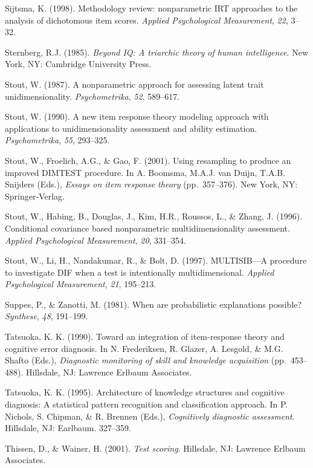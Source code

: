 \documentclass[titlepage,11pt,twoside]{article}
\begin{document}
\begin{thebibliography}
\bibitem Sijtsma, K. (1998). Methodology review: nonparametric IRT approaches to the analysis of dichotomous item scores. \textit{Applied Psychological Measurement}, \textit{22}, 3--32.

\bibitem Sternberg, R.J. (1985). \textit{Beyond IQ: A triarchic theory of human intelligence}. New York, NY: Cambridge University Press.

\bibitem Stout, W. (1987). A nonparametric approach for assessing latent trait unidimensionality. \textit{Psychometrika}, \textit{52}, 589--617.

\bibitem Stout, W. (1990). A new item response theory modeling approach with applications to unidimensionality assessment and ability estimation. \textit{Psychometrika}, \textit{55}, 293--325.

\bibitem Stout, W., Froelich, A.G., \& Gao, F. (2001). Using resampling to produce an improved DIMTEST procedure. In A. Boomsma, M.A.J. van Duijn, T.A.B. Snijders (Eds.), \textit{Essays on item response theory} (pp.~357--376). New York, NY: Springer-Verlag.

\bibitem Stout, W., Habing, B., Douglas, J., Kim, H.R., Roussos, L., \& Zhang, J. (1996). Conditional covariance based nonparametric multidimensionality assessment. \textit{Applied Psychological Measurement}, \textit{20}, 331--354.

\bibitem Stout, W., Li, H., Nandakumar, R., \& Bolt, D. (1997). MULTISIB---A procedure to investigate DIF when a test is intentionally multidimensional. \textit{Applied Psychological Measurement}, \textit{21}, 195--213.

\bibitem Suppes, P., \& Zanotti, M. (1981). When are probabilistic explanations possible? \textit{Synthese}, \textit{48}, 191--199.

\bibitem Tatsuoka, K. K. (1990). Toward an integration of item-response theory and cognitive error diagnosis. In N. Frederiksen, R. Glazer, A. Lesgold, \& M.G. Shafto (Eds.), \textit{Diagnostic monitoring of skill and knowledge acquisition} (pp.~453--488). Hillsdale, NJ: Lawrence Erlbaum Associates.


\bibitem Tatsuoka, K. K. (1995). Architecture of knowledge structures and cognitive diagnosis: A statistical pattern recognition and classification approach. In P. Nichols, S. Chipman, \& R. Brennen (Eds.), \textit{Cognitively diagnostic assessment}. Hillsdale, NJ: Earlbaum. 327--359.

\bibitem Thissen, D., \& Wainer, H. (2001). \textit{Test scoring}. Hillsdale, NJ: Lawrence Erlbaum Associates.


\end{thebibliography}
\end{document}
